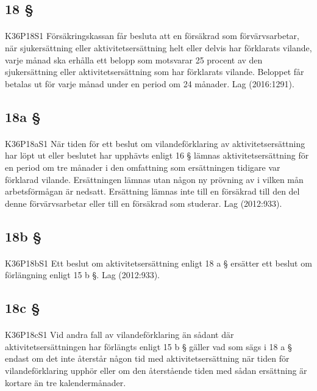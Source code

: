 \documentclass[a4paper,notitlepage,openany,10pt]{book}
\begin{document}
\subsection*{18 §}
\paragraph*{}
{\tiny K36P18S1}
Försäkringskassan får besluta att en försäkrad som förvärvsarbetar, när sjukersättning eller aktivitetsersättning helt eller delvis har förklarats vilande, varje månad ska erhålla ett belopp som motsvarar 25 procent av den sjukersättning eller aktivitetsersättning som har förklarats vilande. Beloppet får betalas ut för varje månad under en period om 24 månader.
Lag (2016:1291).
\subsection*{18a §}
\paragraph*{}
{\tiny K36P18aS1}
När tiden för ett beslut om vilandeförklaring av aktivitetsersättning har löpt ut eller beslutet har upphävts enligt 16 § lämnas aktivitetsersättning för en period om tre månader i den omfattning som ersättningen tidigare var förklarad vilande. Ersättningen lämnas utan någon ny prövning av i vilken mån arbetsförmågan är nedsatt. Ersättning lämnas inte till en försäkrad till den del denne förvärvsarbetar eller till en försäkrad som studerar.
Lag (2012:933).
\subsection*{18b §}
\paragraph*{}
{\tiny K36P18bS1}
Ett beslut om aktivitetsersättning enligt 18 a § ersätter ett beslut om förlängning enligt 15 b §.
Lag (2012:933).
\subsection*{18c §}
\paragraph*{}
{\tiny K36P18cS1}
Vid andra fall av vilandeförklaring än sådant där aktivitetsersättningen har förlängts enligt 15 b § gäller vad som sägs i 18 a § endast om det inte återstår någon tid med aktivitetsersättning när tiden för vilandeförklaring upphör eller om den återstående tiden med sådan ersättning är kortare än tre kalendermånader.
\end{document}
